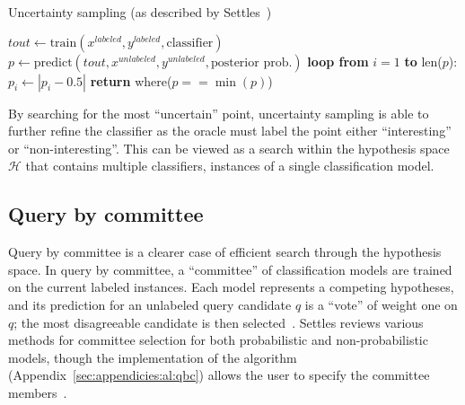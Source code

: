 \tablespacing
\begin{algorithm}[H]
	\caption{Uncertainty sampling (as described by 
	Settles~\cite{settles2010})}\label{euclid}
	\begin{algorithmic}[1]
		\State $\textit{tout} \gets 
		\text{train}(x^{labeled},y^{labeled},\text{classifier})$
		\State $p \gets 
		\text{predict}(\textit{tout},x^{unlabeled},y^{unlabeled},
		\text{posterior prob.})$
		\State \textbf{loop from} $i=1$ \textbf{to} len($p$):
		\State \indent $p_i \gets |p_i-0.5|$
		\State \textbf{return} where($p==\min{(p)}$)
		\EndProcedure
	\end{algorithmic}
\end{algorithm}
\bodyspacing

\noindent By searching for the most ``uncertain'' point, uncertainty sampling 
is able to further refine the classifier as the oracle must label the point 
either ``interesting'' or ``non-interesting''. This can be viewed as a search 
within the hypothesis space $\mathcal{H}$ that contains multiple classifiers, 
instances of a single classification model.








\subsection{Query by committee}
\label{sec:al:methods:qbc}

Query by committee is a clearer case of efficient search through the hypothesis 
space. In query by committee, a ``committee'' of classification models are 
trained on the  current labeled instances.  Each model represents a competing 
hypotheses, and its prediction for an unlabeled query candidate $q$ is a 
``vote'' of weight one on $q$; the most disagreeable candidate is then 
selected~\cite{settles2010}. Settles reviews various methods for committee 
selection for both probabilistic and non-probabilistic models, though the 
implementation of the algorithm (Appendix~\ref{sec:appendicies:al:qbc}) allows 
the user to specify the committee members~\cite{settles2010}. 

